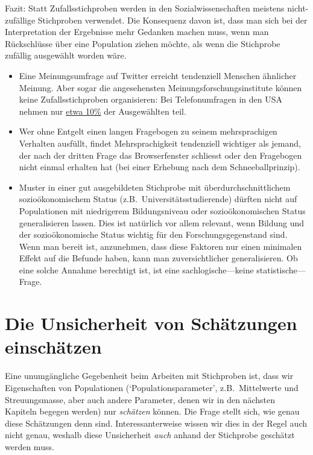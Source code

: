\documentclass[oneside, 10pt]{book}\usepackage[]{graphicx}\usepackage[]{xcolor}
\begin{document}
Fazit: Statt Zufallsstichproben werden in den Sozialwissenschaften
meistens nicht-zu\-fäll\-ige Stichproben verwendet. Die Konsequenz
davon ist, dass man sich bei der Interpretation der Ergebnisse
mehr Gedanken machen muss, wenn man Rückschlüsse über eine Population
ziehen möchte, als wenn die Stichprobe zufällig ausgewählt worden wäre.

\begin{itemize}
\item Eine Meinungsumfrage auf Twitter erreicht
tendenziell Menschen ähnlicher Meinung. Aber sogar die angesehensten Meinungs\-forschungs\-institute können keine
Zufallsstichproben organisieren: Bei Telefonumfragen in den USA
nehmen nur \href{http://www.pewresearch.org/2017/05/15/what-low-response-rates-mean-for-telephone-surveys/}{etwa 10\%} der Ausgewählten teil.

\item Wer ohne Entgelt einen langen Fragebogen
zu seinem mehrsprachigen
Verhalten ausfüllt, findet Mehrsprachigkeit tendenziell wichtiger
als jemand, der nach der dritten Frage das Browserfenster schliesst
oder den Fragebogen nicht einmal erhalten hat
(bei einer Erhebung nach dem Schneeballprinzip).

\item Muster in einer gut ausgebildeten Stichprobe
mit überdurchschnittlichem
sozioökonomischem Status (z.B.\ Universitätsstudierende)
dürften nicht auf Populationen mit niedrigerem
Bildungsniveau oder sozioökonomischen Status generalisieren
lassen.
Dies ist natürlich vor allem relevant, wenn
Bildung und der sozioökonomische Status wichtig für
den Forschungsgegenstand sind. Wenn man bereit ist, anzunehmen,
dass diese Faktoren nur einen minimalen Effekt auf die Befunde haben,
kann man zuversichtlicher generalisieren.
Ob eine solche Annahme berechtigt ist,
ist eine sachlogische---keine statistische---Frage.
\end{itemize}


\chapter{Die Unsicherheit von Schätzungen einschätzen}\label{ch:uncertainty}
Eine unumgängliche Gegebenheit beim Arbeiten mit Stichproben
ist, dass wir Eigenschaften von Populationen
(`Populationsparameter', z.B.\ Mittelwerte und Streuungsmasse,
aber auch andere Parameter,
denen wir in den nächsten Kapiteln begegen
werden) nur \emph{schätzen} können. Die Frage stellt sich, wie
genau diese Schätzungen denn sind. Interessanterweise wissen wir
dies in der Regel auch nicht genau, weshalb diese Unsicherheit
\emph{auch} anhand der Stichprobe geschätzt werden muss.
\end{document}
